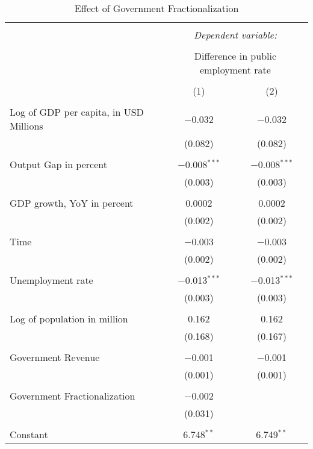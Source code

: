 
\begin{table}[!htbp] \centering 
  \caption{Effect of Government Fractionalization} 
  \label{} 
\begin{tabular}{@{\extracolsep{5pt}}lcc} 
\\[-1.8ex]\hline 
\hline \\[-1.8ex] 
 & \multicolumn{2}{c}{\textit{Dependent variable:}} \\ 
\cline{2-3} 
\\[-1.8ex] & \multicolumn{2}{c}{Difference in public employment rate} \\ 
\\[-1.8ex] & (1) & (2)\\ 
\hline \\[-1.8ex] 
 Log of GDP per capita, in USD Millions & $-$0.032 & $-$0.032 \\ 
  & (0.082) & (0.082) \\ 
  & & \\ 
 Output Gap in percent & $-$0.008$^{***}$ & $-$0.008$^{***}$ \\ 
  & (0.003) & (0.003) \\ 
  & & \\ 
 GDP growth, YoY in percent & 0.0002 & 0.0002 \\ 
  & (0.002) & (0.002) \\ 
  & & \\ 
 Time & $-$0.003 & $-$0.003 \\ 
  & (0.002) & (0.002) \\ 
  & & \\ 
 Unemployment rate & $-$0.013$^{***}$ & $-$0.013$^{***}$ \\ 
  & (0.003) & (0.003) \\ 
  & & \\ 
 Log of population in million & 0.162 & 0.162 \\ 
  & (0.168) & (0.167) \\ 
  & & \\ 
 Government Revenue & $-$0.001 & $-$0.001 \\ 
  & (0.001) & (0.001) \\ 
  & & \\ 
 Government Fractionalization & $-$0.002 &  \\ 
  & (0.031) &  \\ 
  & & \\ 
 Constant & 6.748$^{**}$ & 6.749$^{**}$ \\ 

\end{tabular}
\end{table}
